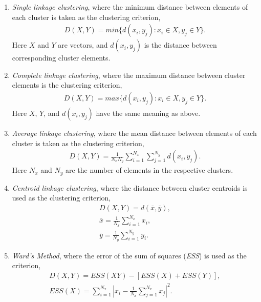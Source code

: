 \begin{enumerate}
\item{ \textit{Single linkage  clustering}, where the minimum distance
  between elements of each cluster is taken as the clustering criterion,
\begin{gather}
D(X, Y)=min\{d(x_i, y_j): x_i \in X, y_j \in Y \}.
\end{gather}
Here  $X$ and  $Y$ are  vectors, and  $d(x_i, y_j)$  is  the distance
between corresponding cluster elements.}

\item{  \textit{Complete   linkage  clustering},  where   the  maximum
  distance between cluster elements is the clustering criterion,
\begin{gather}
D(X, Y)=max\{d(x_i, y_j): x_i \in X, y_j \in Y \}.
\end{gather} }
Here $X$, $Y$, and $d(x_{i},y_{j})$ have the same meaning as above.
  
\item{  \textit{Average linkage clustering},  where the  mean distance
  between  elements  of  each  cluster  is  taken  as  the  clustering
  criterion,
\begin{gather}
D(X, Y)=\frac{1}{N_x   N_y} \sum_{i=1}^{N_x}  \sum_{j=1}^{N_y} d(x_i,
y_j).
\end{gather}
Here $N_x$ and $N_y$ are the number of elements in the respective
clusters.  }

\item{ \textit{Centroid linkage clustering}, where the distance between
  cluster centroids is used as the clustering criterion,
\begin{gather}
D(X, Y)=d(\overline{x}, \overline{y}) ,\\
\overline{x} = \frac{1}{N_x} \sum_{i=1}^{N_x} x_i ,\\
\overline{y} = \frac{1}{N_y} \sum_{i=1}^{N_y} y_i.
\end{gather} }

\item{ \textit{Ward's Method},  where the error of the  sum of squares
  (\textit{ESS}) is used as the criterion,
\begin{gather}
D(X,Y)=ESS(XY) -[ESS(X) + ESS(Y)] ,\\
ESS(X)=  \sum_{i=1}^{N_x} \left|
x_i -\frac{1}{N_x}\sum_{j=1}^{N_x} x_j\right|^2 .
\end{gather} }
\end{enumerate}

